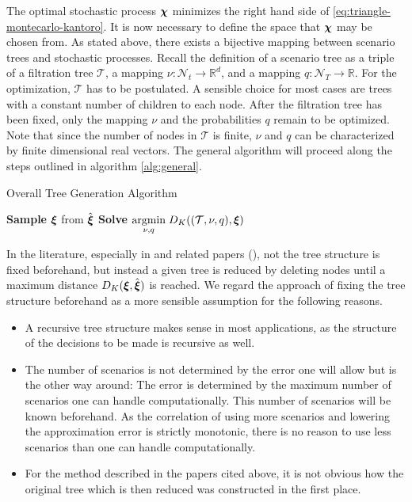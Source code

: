 The optimal stochastic process $\boldsymbol\chi$ minimizes the right hand side of \eqref{eq:triangle-montecarlo-kantoro}.
It is now necessary to define the space that $\boldsymbol\chi$ may be chosen from.
As stated above, there exists a bijective mapping between scenario trees and stochastic processes.
Recall the definition of a scenario tree as a triple of a filtration tree $\mathcal{T}$, a mapping $\nu:\mathcal{N}_t\rightarrow\mathbb{R}^d$, and a mapping $q:\mathcal{N}_T\rightarrow\mathbb{R}$.
For the optimization, $\mathcal{T}$ has to be postulated.
A sensible choice for most cases are trees with a constant number of children to each node.
After the filtration tree has been fixed, only the mapping $\nu$ and the probabilities $q$ remain to be optimized.
Note that since the number of nodes in $\mathcal{T}$ is finite, $\nu$ and $q$ can be characterized by finite dimensional real vectors.
The general algorithm will proceed along the steps outlined in algorithm \ref{alg:general}.
\begin{algorithm}
  \label{alg:general}
  \caption{Overall Tree Generation Algorithm}
  \BlankLine
  \textbf{Sample} $\boldsymbol\xi$ from $\hat{\boldsymbol\xi}$\;
  \textbf{Solve} $\underset{\nu,q}{\operatorname{argmin}}\; D_K((\mathcal{T},\nu, q), \boldsymbol\xi)$\;
\end{algorithm}

In the literature, especially in \citet{Heitsch2009} and related papers (\cite{Dupacova2003,Heitsch2003,Heitsch2009a,Heitsch2010}), not the tree structure is fixed beforehand, but instead a given tree is reduced by deleting nodes until a maximum distance $D_K(\boldsymbol\xi,\hat{\boldsymbol\xi})$ is reached.
We regard the approach of fixing the tree structure beforehand as a more sensible assumption for the following reasons.
\begin{itemize}
\item A recursive tree structure makes sense in most applications, as the structure of the decisions to be made is recursive as well.
\item The number of scenarios is not determined by the error one will allow but is the other way around: The error is determined by the maximum number of scenarios one can handle computationally.
This number of scenarios will be known beforehand.
As the correlation of using more scenarios and lowering the approximation error is strictly monotonic, there is no reason to use less scenarios than one can handle computationally.
\item For the method described in the papers cited above, it is not obvious how the original tree which is then reduced was constructed in the first place.
\end{itemize}

